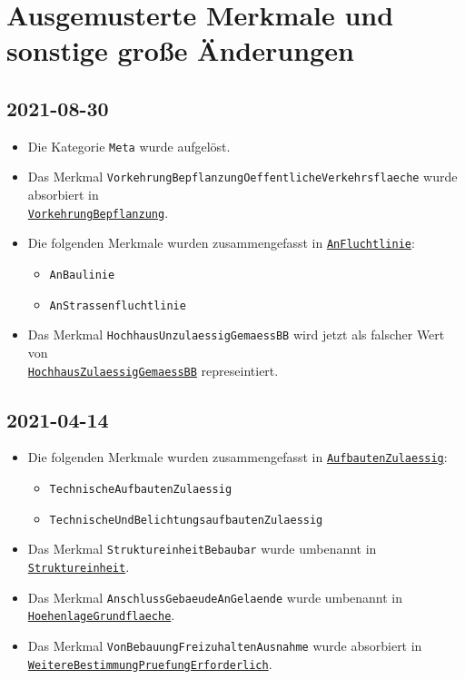 \documentclass{article}
\newcommand{\mml}[1]{\texttt{#1}}
\newcommand{\merkmal}[2]{\subsubsection{\mml{#1}}\label{merkmal:#1}\index{\category! #1}\begin{description}#2\end{description}\medskip}
\newcommand{\erlaeuterung}[1]{\item[Erläuterung]:\\ #1 }
\newcommand{\wert}[1]{\item[Wert]:\\ #1 }
\newcommand{\beispiel}[1]{\item[Beispiele]:\\ #1 }
\newcommand{\rechtsmaterie}[1]{\item[Rechtsmaterie]:  \\#1 }
\newcommand{\merkmalref}[1]{\hyperref[merkmal:#1]{\mml{#1}}}
\newcommand{\category}{none}
\begin{document}







\appendix
\printindex



\section{Ausgemusterte Merkmale und sonstige große Änderungen}
\label{sec:changes}


\subsection{2021-08-30}
\label{changes:2021-08-30}
\begin{itemize}
\item Die Kategorie \mml{Meta} wurde aufgelöst.
\item Das Merkmal \mml{VorkehrungBepflanzungOeffentlicheVerkehrsflaeche} wurde absorbiert in \\
\merkmalref{VorkehrungBepflanzung}.
\item Die folgenden Merkmale wurden zusammengefasst in \merkmalref{AnFluchtlinie}:
\begin{itemize}
	\item \mml{AnBaulinie}
	\item \mml{AnStrassenfluchtlinie}
\end{itemize}
\item Das Merkmal \mml{HochhausUnzulaessigGemaessBB} wird jetzt als falscher Wert von \\ \merkmalref{HochhausZulaessigGemaessBB} represeintiert.
\end{itemize}

\subsection{2021-04-14}
\label{changes:2021-04-14}
\begin{itemize}
\item Die folgenden Merkmale wurden zusammengefasst in \merkmalref{AufbautenZulaessig}:
\begin{itemize}
	\item \mml{TechnischeAufbautenZulaessig}
	\item \mml{TechnischeUndBelichtungsaufbautenZulaessig}
\end{itemize}
\item Das Merkmal \mml{StruktureinheitBebaubar} wurde umbenannt in \merkmalref{Struktureinheit}.
\item Das Merkmal \mml{AnschlussGebaeudeAnGelaende} wurde umbenannt in
\merkmalref{HoehenlageGrundflaeche}.
\item Das Merkmal \mml{VonBebauungFreizuhaltenAusnahme} wurde
absorbiert in\\ \merkmalref{WeitereBestimmungPruefungErforderlich}.
\end{itemize}
\end{document}

